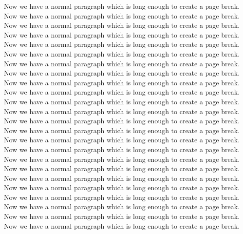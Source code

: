 \documentclass{book}
\begin{document}
\pstart
Now we have a normal paragraph which is long enough to
create a page break.
Now we have a normal paragraph which is long enough to
create a page break.
Now we have a normal paragraph which is long enough to
create a page break.
Now we have a normal paragraph which is long enough to
create a page break.
Now we have a normal paragraph which is long enough to
create a page break.
Now we have a normal paragraph which is long enough to
create a page break.
Now we have a normal paragraph which is long enough to
create a page break.
Now we have a normal paragraph which is long enough to
create a page break.
Now we have a normal paragraph which is long enough to
create a page break.
Now we have a normal paragraph which is long enough to
create a page break.
Now we have a normal paragraph which is long enough to
create a page break.
Now we have a normal paragraph which is long enough to
create a page break.
Now we have a normal paragraph which is long enough to
create a page break.
Now we have a normal paragraph which is long enough to
create a page break.
Now we have a normal paragraph which is long enough to
create a page break.
Now we have a normal paragraph which is long enough to
create a page break.
Now we have a normal paragraph which is long enough to
create a page break.
Now we have a normal paragraph which is long enough to
create a page break.
Now we have a normal paragraph which is long enough to
create a page break.
Now we have a normal paragraph which is long enough to
create a page break.
Now we have a normal paragraph which is long enough to
create a page break.
Now we have a normal paragraph which is long enough to
create a page break.
Now we have a normal paragraph which is long enough to
create a page break.
Now we have a normal paragraph which is long enough to
create a page break.
\pend

\pausenumbering
\end{document}
